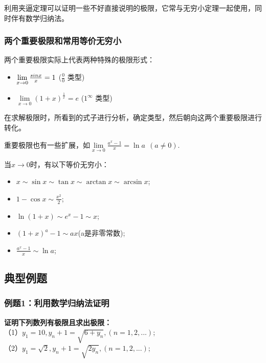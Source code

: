 \documentclass[12pt , a4paper , oneside]{ctexart}
\begin{document}
            利用夹逼定理可以证明一些不好直接说明的极限，它常与无穷小定理一起使用，同时伴有数学归纳法。

            \subsubsection{两个重要极限和常用等价无穷小}

            两个重要极限实际上代表两种特殊的极限形式：
            \begin{itemize}
                \item $\lim\limits_{x \to 0} \frac{\\sin  x}{x} = 1$ ($\frac{0}{0}$ 类型)
                \item $\lim\limits_{x \to 0} (1+x)^\frac{1}{x} = e$ ($1^\infty$ 类型)
            \end{itemize}

            在求解极限时，所看到的式子进行分析，确定类型，然后朝向这两个重要极限进行转化。

            重要极限也有一些扩展，如$\lim\limits_{x \to 0} \frac{a^x-1}{x} = \ln a~~(a \neq 0)$.

            当$x \to 0$时，有以下等价无穷小：
            \begin{itemize}
                
            \item  $x \sim \sin  x \sim \tan x \sim \arctan x \sim \arcsin  x$;
            
            \item  $1-\cos  x \sim \frac{x^2}{2}$;

            \item  $\ln(1+x) \sim e^x - 1 \sim x$;

            \item  $(1+x)^a -1 \sim ax$(a是非零常数);

            \item  $\frac{a^x-1}{x} \sim \ln a$;
            \end{itemize}
        \subsection{典型例题}
            \subsubsection{例题1：利用数学归纳法证明}
            \textbf{证明下列数列有极限且求出极限：}\\
            （1）$y_1=10,y_n+1 = \sqrt{6+y_n},(n=1,2,...)$;\\
            （2）$y_1=\sqrt{2},y_n+1 = \sqrt{2 y_n},(n=1,2,...)$;\\
\end{document}
